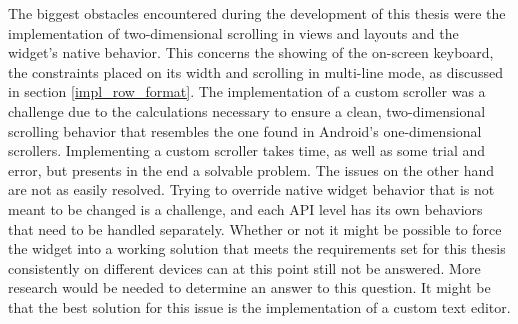 The biggest obstacles encountered during the development of this thesis were the implementation of two-dimensional scrolling in views and layouts and the  widget's native behavior. This concerns the showing of the on-screen keyboard, the constraints placed on its width and scrolling in multi-line mode, as discussed in section \ref{impl_row_format}. The implementation of a custom scroller was a challenge due to the calculations necessary to ensure a clean, two-dimensional scrolling behavior that resembles the one found in Android's one-dimensional scrollers. Implementing a custom scroller takes time, as well as some trial and error, but presents in the end a solvable problem. The  issues on the other hand are not as easily resolved. Trying to override native widget behavior that is not meant to be changed is a challenge, and each \gls{API} level has its own behaviors that need to be handled separately. Whether or not it might be possible to force the  widget into a working solution that meets the requirements set for this thesis consistently on different devices can at this point still not be answered. More research would be needed to determine an answer to this question. It might be that the best solution for this issue is the implementation of a custom text editor.